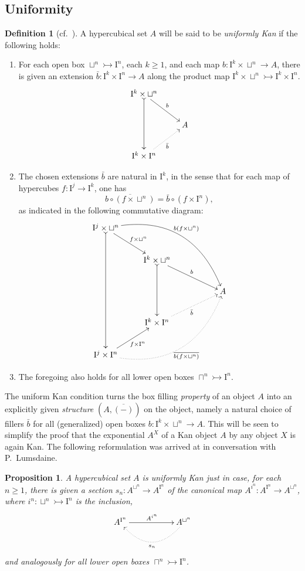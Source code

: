 \documentclass[11pt]{article}
\newcommand{\mono}{\ensuremath{\rightarrowtail}}
\newcommand{\I}{\ensuremath{\mathrm{I}}}
\newtheorem{proposition}[theorem]{Proposition}
\theoremstyle{remark}
\theoremstyle{definition}
\newtheorem{definition}[theorem]{Definition}
\begin{document}
\subsection{Uniformity}

\begin{definition}[cf.~\cite{BCH}]  A hypercubical set $A$ will be said to be \emph{uniformly Kan} if the following holds:
\begin{enumerate}
\item  For each open box $\sqcup^n \mono \I^n$, each $k\geq 1$, and each map $b: \I^k \times\sqcup^n\to A$, there is given an extension $\bar{b} : \I^k\times\I^n \to A$ along the product map $\I^k\times\sqcup^n \mono \I^k\times\I^n$.
\begin{equation}\label{diagram:uniformsimple}
\xymatrix{
\I^k\times \sqcup^n\ar@{>->}[dd] \ar[rd]^{b}  &\\
	& A\\
 \I^k \times \I^n \ar@{..>}[ru]_{\bar{b}} &
}
\end{equation}
\item The chosen extensions $\bar{b}$ are natural in $\I^k$, in the sense that for each map of hypercubes $f : \I^j \to \I^k$, one has
\[
\overline{b\circ(f\times\sqcup^n)} = \bar{b}\circ (f\times\I^n),
\]
as indicated in the following commutative diagram:
\begin{equation}\label{diagram:uniformnatural}
\xymatrix{
\I^j\times \sqcup^n\ar@{>->}[dddd] \ar@/{}^{3pc}/[rrrdd]^{b(f\times\sqcup^n)} \ar[rd]^{f\times\sqcup^n} &&& \\
	& \I^k\times \sqcup^n\ar@{>->}[dd] \ar[rrd]^{b}  &&\\
	&&& A\\
	& \I^k \times \I^n \ar@{..>}[rru]_{\bar{b}} &&\\
 \I^j \times \I^n \ar@{.>}@/{}_{3pc}/[rrruu]_{\overline{b(f\times\sqcup^n)}} \ar[ru]_{f\times\I^n} &&&
}
\end{equation}
\item The foregoing also holds for all lower open boxes $\sqcap^n \mono \I^n$.
\end{enumerate}
\end{definition}

The uniform Kan condition turns the box filling \emph{property} of an object $A$ into an explicitly given \emph{structure} $(A, \overline{(-)})$ on the object, namely a natural choice of fillers $\bar{b}$ for all (generalized) open boxes $b : \I^k\times \sqcup^n \to A$.  This will be seen to simplify the proof that the exponential $A^X$ of a Kan object  $A$ by any object $X$ is again Kan. The following reformulation was arrived at in conversation with P.~Lumsdaine.
%
\begin{proposition}
A hypercubical set $A$ is uniformly Kan just in case, for each $n\geq 1$, there is given a section $s_n : A^{\sqcup^n} \to A^{\I^n}$ of the canonical map $A^{i^n} : A^{\I^n}\to A^{\sqcup^n}$, where $i^n : \sqcup^n \mono \I^n$ is the inclusion,
\[
\xymatrix{
A^{\I^n} \ar[rr]^{A^{i^n}} & & \ar@{.>}@/{}^{2pc}/[ll]^{s_n} A^{\sqcup^n}
}
\]
and analogously for all lower open boxes $\sqcap^n \mono \I^n$.
\end{proposition}
\end{document}

